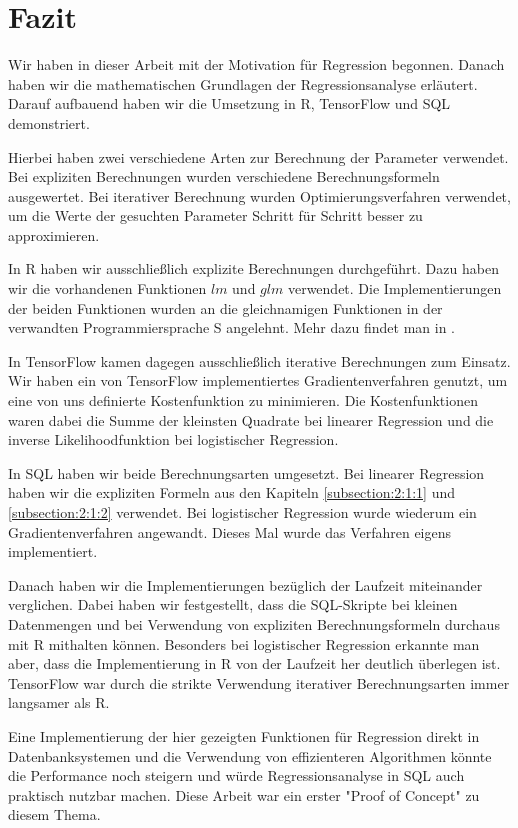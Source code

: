 \chapter{Fazit}
\label{chapter:6}

Wir haben in dieser Arbeit mit der Motivation für Regression begonnen. Danach haben wir die mathematischen Grundlagen der Regressionsanalyse erläutert. Darauf aufbauend haben wir die Umsetzung in R, TensorFlow und SQL demonstriert.

Hierbei haben zwei verschiedene Arten zur Berechnung der Parameter verwendet. Bei expliziten Berechnungen wurden verschiedene Berechnungsformeln ausgewertet. Bei iterativer Berechnung wurden Optimierungsverfahren verwendet, um die Werte der gesuchten Parameter Schritt für Schritt besser zu approximieren.

In R haben wir ausschließlich explizite Berechnungen durchgeführt. Dazu haben wir die vorhandenen Funktionen $lm$ und $glm$ verwendet. Die Implementierungen der beiden Funktionen wurden an die gleichnamigen Funktionen in der verwandten Programmiersprache S angelehnt. Mehr dazu findet man in \cite{statistical}.

In TensorFlow kamen dagegen ausschließlich iterative Berechnungen zum Einsatz. Wir haben ein von TensorFlow implementiertes Gradientenverfahren genutzt, um eine von uns definierte Kostenfunktion zu minimieren. Die Kostenfunktionen waren dabei die Summe der kleinsten Quadrate bei linearer Regression und die inverse Likelihoodfunktion bei logistischer Regression.

In SQL haben wir beide Berechnungsarten umgesetzt. Bei linearer Regression haben wir die expliziten Formeln aus den Kapiteln \ref{subsection:2:1:1} und \ref{subsection:2:1:2} verwendet. Bei logistischer Regression wurde wiederum ein Gradientenverfahren angewandt. Dieses Mal wurde das Verfahren eigens implementiert.

Danach haben wir die Implementierungen bezüglich der Laufzeit miteinander verglichen. Dabei haben wir festgestellt, dass die SQL-Skripte bei kleinen Datenmengen und bei Verwendung von expliziten Berechnungsformeln durchaus mit R mithalten können. Besonders bei logistischer Regression erkannte man aber, dass die Implementierung in R von der Laufzeit her deutlich überlegen ist. TensorFlow war durch die strikte Verwendung iterativer Berechnungsarten immer langsamer als R.

Eine Implementierung der hier gezeigten Funktionen für Regression direkt in Datenbanksystemen und die Verwendung von effizienteren Algorithmen könnte die Performance noch steigern und würde Regressionsanalyse in SQL auch praktisch nutzbar machen. Diese Arbeit war ein erster "Proof of Concept" zu diesem Thema.
